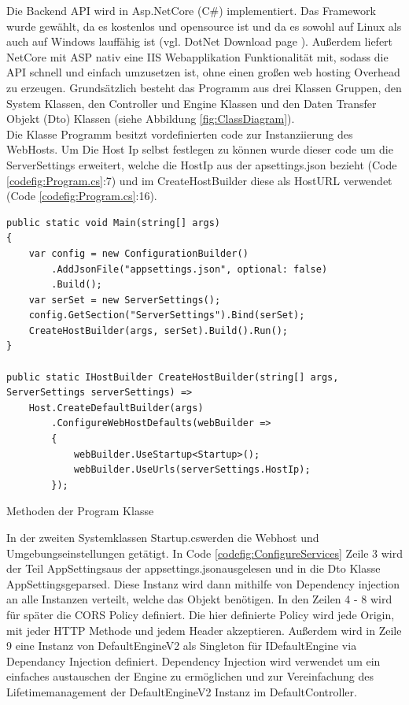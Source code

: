 Die Backend API wird in Asp.NetCore (C\#) implementiert. Das Framework wurde gewählt, da es kostenlos und opensource ist und da es sowohl auf Linux als auch auf Windows lauffähig ist (vgl. DotNet Download page \cite{DotNetDownloadPage}). Außerdem liefert NetCore mit ASP nativ eine IIS Webapplikation Funktionalität mit, sodass die API schnell und einfach umzusetzen ist, ohne einen großen web hosting Overhead zu erzeugen. Grundsätzlich besteht das Programm aus drei Klassen Gruppen, den System Klassen, den Controller und Engine Klassen und den Daten Transfer Objekt (Dto) Klassen (siehe Abbildung \ref{fig:ClassDiagram}).\\
Die Klasse Programm besitzt vordefinierten code zur Instanziierung des WebHosts. Um Die Host Ip selbst festlegen zu können wurde dieser code um die ServerSettings erweitert, welche die HostIp aus der apsettings.json bezieht (Code \ref{codefig:Program.cs}:7) und im CreateHostBuilder diese als HostURL verwendet (Code \ref{codefig:Program.cs}:16).\\
\begin{codefig}
	\centering
	\lstset{style=sharpc}
	\begin{lstlisting}
public static void Main(string[] args)
{
	var config = new ConfigurationBuilder()
		.AddJsonFile("appsettings.json", optional: false)
		.Build();
	var serSet = new ServerSettings();
	config.GetSection("ServerSettings").Bind(serSet);
	CreateHostBuilder(args, serSet).Build().Run();
}

public static IHostBuilder CreateHostBuilder(string[] args, ServerSettings serverSettings) =>
	Host.CreateDefaultBuilder(args)
		.ConfigureWebHostDefaults(webBuilder =>
		{
			webBuilder.UseStartup<Startup>();
			webBuilder.UseUrls(serverSettings.HostIp);
		});
	\end{lstlisting}
	\caption{Methoden der Program Klasse}
	\label{codefig:Program.cs}
\end{codefig}
In der zweiten Systemklassen \grqq Startup.cs\grqq\space werden die Webhost und Umgebungseinstellungen getätigt. In Code \ref{codefig:ConfigureServices} Zeile 3 wird der Teil \grqq AppSettings\grqq\space aus der \grqq appsettings.json\grqq\space ausgelesen und in die Dto Klasse \grqq AppSettings\grqq\space geparsed. Diese Instanz wird dann mithilfe von Dependency injection an alle Instanzen verteilt, welche das Objekt benötigen. In den Zeilen 4 - 8 wird für später die CORS Policy definiert. Die hier definierte Policy wird jede Origin, mit jeder HTTP Methode und jedem Header akzeptieren. Außerdem wird in Zeile 9 eine Instanz von DefaultEngineV2 als Singleton für IDefaultEngine via Dependancy Injection definiert. Dependency Injection wird verwendet um ein einfaches austauschen der Engine zu ermöglichen und zur Vereinfachung des Lifetimemanagement der DefaultEngineV2 Instanz im DefaultController.\\
